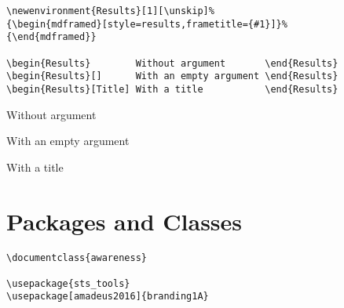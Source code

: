 \begin{LaTeXsource}[Environments]
\begin{verbatim}
\newenvironment{Results}[1][\unskip]%
{\begin{mdframed}[style=results,frametitle={#1}]}%
{\end{mdframed}}

\begin{Results}        Without argument       \end{Results}
\begin{Results}[]      With an empty argument \end{Results}
\begin{Results}[Title] With a title           \end{Results}
\end{verbatim}
\end{LaTeXsource}

\begin{Results}
Without argument
\end{Results}

\begin{Results}[]
With an empty argument
\end{Results}

\begin{Results}
With a title
\end{Results}

\pagebreak
\section{Packages and Classes}

\begin{LaTeXsource}[Environments]
\begin{verbatim}
\documentclass{awareness}

\usepackage{sts_tools}
\usepackage[amadeus2016]{branding1A}
\end{verbatim}
\end{LaTeXsource}
